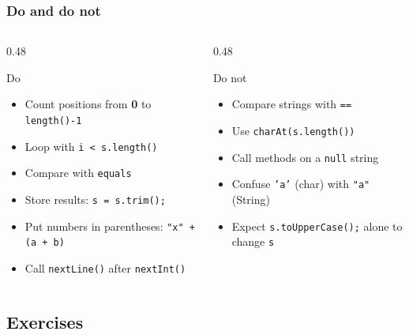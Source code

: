 \documentclass[aspectratio=169,10pt,compress]{beamer}
\begin{document}
\begin{frame}[t,fragile] \frametitle{Do and do not}
  \small
  \begin{columns}[T]
    \begin{column}{0.48\textwidth}
      \begin{block}{Do}
        \begin{itemize}
          \item Count positions from \textbf{0} to \texttt{length()-1}
          \item Loop with \texttt{i < s.length()}
          \item Compare with \texttt{equals}
          \item Store results: \texttt{s = s.trim();}
          \item Put numbers in parentheses: \texttt{"x" + (a + b)}
          \item Call \texttt{nextLine()} after \texttt{nextInt()}
        \end{itemize}
      \end{block}
    \end{column}
    \begin{column}{0.48\textwidth}
      \begin{alertblock}{Do not}
        \begin{itemize}
          \item Compare strings with \texttt{==}
          \item Use \texttt{charAt(s.length())}
          \item Call methods on a \texttt{null} string
          \item Confuse \texttt{'a'} (char) with \texttt{"a"} (String)
          \item Expect \texttt{s.toUpperCase();} alone to change \texttt{s}
        \end{itemize}
      \end{alertblock}
    \end{column}
  \end{columns}
\end{frame}

\subsection[Exercises]{Exercises}
\end{document}

